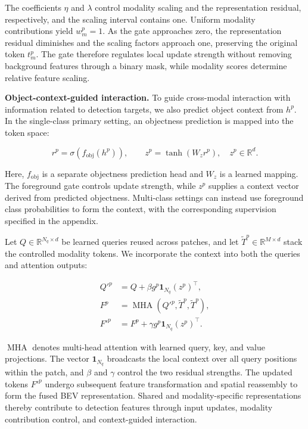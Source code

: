 The coefficients \(\eta\) and \(\lambda\) control modality scaling and the representation residual, respectively, and the scaling interval contains one. Uniform modality contributions yield \(w_m^p=1\). As the gate approaches zero, the representation residual diminishes and the scaling factors approach one, preserving the original token \(t_m^p\). The gate therefore regulates local update strength without removing background features through a binary mask, while modality scores determine relative feature scaling.

\textbf{Object-context-guided interaction.} To guide cross-modal interaction with information related to detection targets, we also predict object context from \(h^p\). In the single-class primary setting, an objectness prediction is mapped into the token space:

\begin{equation}
r^p=\sigma\!\left(f_{\mathrm{obj}}(h^p)\right),\qquad
z^p=\tanh(W_z r^p),\quad z^p\in\mathbb R^d.
\label{eq:5}
\end{equation}

Here, \(f_{\mathrm{obj}}\) is a separate objectness prediction head and \(W_z\) is a learned mapping. The foreground gate controls update strength, while \(z^p\) supplies a context vector derived from predicted objectness. Multi-class settings can instead use foreground class probabilities to form the context, with the corresponding supervision specified in the appendix.

Let \(Q\in\mathbb R^{N_q\times d}\) be learned queries reused across patches, and let \(\widetilde T^p\in\mathbb R^{M\times d}\) stack the controlled modality tokens. We incorporate the context into both the queries and attention outputs:

\begin{equation}
\begin{aligned}
Q'^p&=Q+\beta g^p\mathbf 1_{N_q}(z^p)^\top,\\
F^p&=\operatorname{MHA}(Q'^p,\widetilde T^p,\widetilde T^p),\\
F'^p&=F^p+\gamma g^p\mathbf 1_{N_q}(z^p)^\top.
\end{aligned}
\label{eq:6}
\end{equation}

\(\operatorname{MHA}\) denotes multi-head attention with learned query, key, and value projections. The vector \(\mathbf 1_{N_q}\) broadcasts the local context over all query positions within the patch, and \(\beta\) and \(\gamma\) control the two residual strengths. The updated tokens \(F'^p\) undergo subsequent feature transformation and spatial reassembly to form the fused BEV representation. Shared and modality-specific representations thereby contribute to detection features through input updates, modality contribution control, and context-guided interaction.

